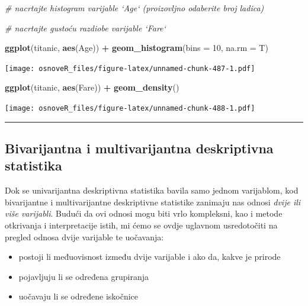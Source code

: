 \documentclass[]{book}
\newenvironment{Shaded}{\begin{snugshade}}{\end{snugshade}}
\newcommand{\KeywordTok}[1]{\textcolor[rgb]{0.13,0.29,0.53}{\textbf{#1}}}
\newcommand{\DataTypeTok}[1]{\textcolor[rgb]{0.13,0.29,0.53}{#1}}
\newcommand{\DecValTok}[1]{\textcolor[rgb]{0.00,0.00,0.81}{#1}}
\newcommand{\StringTok}[1]{\textcolor[rgb]{0.31,0.60,0.02}{#1}}
\newcommand{\CommentTok}[1]{\textcolor[rgb]{0.56,0.35,0.01}{\textit{#1}}}
\newcommand{\OperatorTok}[1]{\textcolor[rgb]{0.81,0.36,0.00}{\textbf{#1}}}
\newcommand{\NormalTok}[1]{#1}
\providecommand{\tightlist}{%
  \setlength{\itemsep}{0pt}\setlength{\parskip}{0pt}}
\theoremstyle{definition}
\theoremstyle{definition}
\theoremstyle{definition}
\theoremstyle{remark}
\begin{document}
\begin{Shaded}
\begin{Highlighting}[]
\CommentTok{# nacrtajte histogram varijable `Age` (proizovljno odaberite broj ladica)}

\CommentTok{# nacrtajte gustoću razdiobe varijable `Fare`}
\end{Highlighting}
\end{Shaded}

\begin{Shaded}
\begin{Highlighting}[]
\KeywordTok{ggplot}\NormalTok{(titanic, }\KeywordTok{aes}\NormalTok{(Age)) }\OperatorTok{+}\StringTok{ }\KeywordTok{geom_histogram}\NormalTok{(}\DataTypeTok{bins =} \DecValTok{10}\NormalTok{, }\DataTypeTok{na.rm =}\NormalTok{ T)}
\end{Highlighting}
\end{Shaded}

\texttt{[image: osnoveR\_files/figure-latex/unnamed-chunk-487-1.pdf]}

\begin{Shaded}
\begin{Highlighting}[]
\KeywordTok{ggplot}\NormalTok{(titanic, }\KeywordTok{aes}\NormalTok{(Fare)) }\OperatorTok{+}\StringTok{ }\KeywordTok{geom_density}\NormalTok{()}
\end{Highlighting}
\end{Shaded}

\texttt{[image: osnoveR\_files/figure-latex/unnamed-chunk-488-1.pdf]}

\begin{center}\rule{0.5\linewidth}{\linethickness}\end{center}

\subsection{Bivarijantna i multivarijantna deskriptivna
statistika}\label{bivarijantna-i-multivarijantna-deskriptivna-statistika}

Dok se univarijantna deskriptivna statistika bavila samo jednom
varijablom, kod bivarijantne i multivarijantne deskriptivne statistike
zanimaju nas odnosi \emph{dvije ili više varijabli}. Budući da ovi
odnosi mogu biti vrlo kompleksni, kao i metode otkrivanja i
interpretacije istih, mi ćemo se ovdje uglavnom usredotočiti na pregled
odnosa dvije varijable te uočavanja:

\begin{itemize}
\tightlist
\item
  postoji li međuovisnost između dvije varijable i ako da, kakve je
  prirode
\item
  pojavljuju li se određena grupiranja
\item
  uočavaju li se određene iskočnice
\end{itemize}
\end{document}
